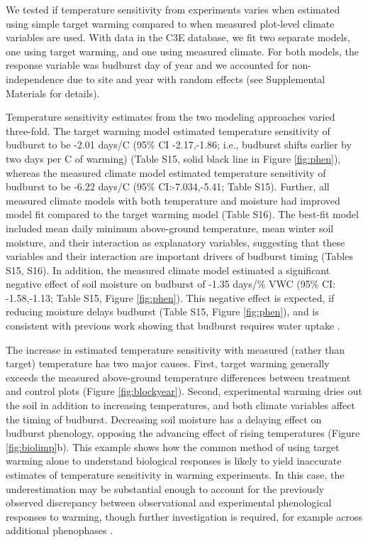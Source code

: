 \documentclass{article}
\begin{document}
\par We tested if temperature sensitivity from experiments varies when estimated using simple target warming compared to when measured plot-level climate variables are used. With data in the C3E database, we fit two separate models, one using target warming, and one using measured climate. For both models, the response variable was budburst day of year and we accounted for non-independence due to site and year with random effects (see Supplemental Materials for details). 

\par Temperature sensitivity estimates from the two modeling approaches varied three-fold. The target warming model estimated temperature sensitivity of budburst to be -2.01 days/\degree C (95\% CI -2.17,-1.86; i.e., budburst shifts earlier by two days per \degree C of warming) (Table S15, solid black line in Figure \ref{fig:phen}), whereas the measured climate model estimated temperature sensitivity of budburst to be -6.22 days/\degree C (95\% CI:-7.034,-5.41; Table S15). Further, all measured climate models with both temperature and moisture had improved model fit compared to the target warming model (Table S16). The best-fit model included mean daily minimum above-ground temperature, mean winter soil moisture, and their interaction as explanatory variables, suggesting that these variables and their interaction are important drivers of budburst timing (Tables S15, S16). 
In addition, the measured climate model estimated a significant negative effect of soil moisture on budburst of -1.35 days/\% VWC (95\% CI: -1.58,-1.13; Table S15, Figure \ref{fig:phen}). This negative effect is expected, if reducing moisture delays budburst (Table S15, Figure \ref{fig:phen}), and is consistent with previous work showing that budburst requires water uptake \citep{essiamah1986}. 

\par The increase in estimated temperature sensitivity with measured (rather than target) temperature has two major causes. First, target warming generally exceeds the measured above-ground temperature differences between treatment and control plots (Figure \ref{fig:blockyear}). Second, experimental warming dries out the soil in addition to increasing temperatures, and both climate variables affect the timing of budburst. %
Decreasing soil moisture has a delaying effect on budburst phenology, opposing the advancing effect of rising temperatures (Figure \ref{fig:biolimp}b). This example shows how the common method of using target warming alone to understand biological responses is likely to yield inaccurate estimates of temperature sensitivity in warming experiments. In this case, the underestimation may be substantial enough to account for the previously observed discrepancy between observational and experimental phenological responses to warming, though further investigation is required, for example across additional phenophases \citep{wolkovich2012}. 
\end{document}
